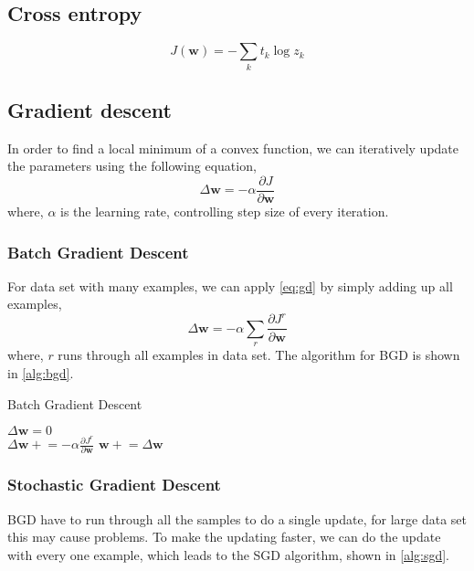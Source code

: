 \documentclass[12pt]{article}
\newcommand{\pluseq}{\mathrel{+}=}
\numberwithin{equation}{section}
\begin{document}
\subsection{Cross entropy}
\begin{equation} \label{eq:cross_ent}
    J(\bm{w}) = -\sum_k{t_k}{\log z_k}
\end{equation}

\subsection{Gradient descent}
In order to find a local minimum of a convex function, we can iteratively update the parameters using the following equation,
\begin{equation} \label{eq:gd}
    \Delta\bm{w} = -\alpha\frac{\partial J}{\partial \bm{w}}
\end{equation}
where, $\alpha$ is the learning rate, controlling step size of every iteration.

\subsubsection{Batch Gradient Descent}
For data set with many examples, we can apply \autoref{eq:gd} by simply adding up all examples,
\begin{equation} \label{eq:bgd}
    \Delta\bm{w} = -\alpha\sum_r\frac{\partial J^{r}}{\partial \bm{w}}
\end{equation}
where, $r$ runs through all examples in data set. The algorithm for BGD is shown in \autoref{alg:bgd}.

\begin{algorithm}[H] 
  \caption{Batch Gradient Descent} \label{alg:bgd}
  
   {
    $\Delta\bm{w} = 0$ \\
     {
       $\Delta\bm{w} \pluseq -\alpha\frac{\partial J^{r}}{\partial \bm{w}}$ 
    }
    $\bm{w} \pluseq \Delta\bm{w}$
  }
\end{algorithm}

\subsubsection{Stochastic Gradient Descent}
BGD have to run through all the samples to do a single update, for large data set this may cause problems.
To make the updating faster, we can do the update with every one example, which leads to the SGD algorithm, shown in \autoref{alg:sgd}.
\end{document}
